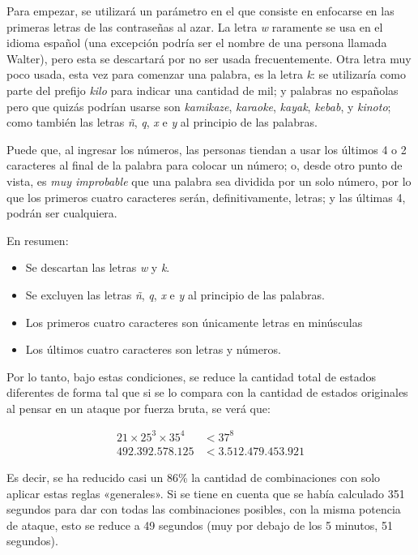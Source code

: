 \documentclass[12pt,a4paper,twoside]{book}
\begin{document}
Para empezar, se utilizará un parámetro en el que consiste en enfocarse en las primeras letras de las contraseñas al azar. La letra \textit{w} raramente se usa en el idioma español (una excepción podría ser el nombre de una persona llamada Walter), pero esta se descartará por no ser usada frecuentemente. Otra letra muy poco usada, esta vez para comenzar una palabra, es la letra \textit{k}: se utilizaría como parte del prefijo \textit{kilo} para indicar una cantidad de mil; y palabras no españolas pero que quizás podrían usarse son \textit{kamikaze}, \textit{karaoke}, \textit{kayak}, \textit{kebab}, y \textit{kinoto}; como también las letras \textit{ñ}, \textit{q}, \textit{x} e \textit{y} al principio de las palabras.

Puede que, al ingresar los números, las personas tiendan a usar los últimos 4 o 2 caracteres al final de la palabra para colocar un número; o, desde otro punto de vista, es \textit{muy improbable} que una palabra sea dividida por un solo número, por lo que los primeros cuatro caracteres serán, definitivamente, letras; y las últimas 4, podrán ser cualquiera.

En resumen: 

\begin{itemize}
\item Se descartan las letras \textit{w} y \textit{k}.
\item Se excluyen las letras \textit{ñ}, \textit{q}, \textit{x} e \textit{y} al principio de las palabras.
\item Los primeros cuatro caracteres son únicamente letras en minúsculas
\item Los últimos cuatro caracteres son letras y números.
\end{itemize}

Por lo tanto, bajo estas condiciones, se reduce la cantidad total de estados diferentes de forma tal que si se lo compara con la cantidad de estados originales al pensar en un ataque por fuerza bruta, se verá que:

\begin{align*}
21 \times 25^3 \times 35^4 &< 37^8 \\
492.392.578.125 &< 3.512.479.453.921
\end{align*}

Es decir, se ha reducido casi un 86\% la cantidad de combinaciones con solo aplicar estas reglas «generales». Si se tiene en cuenta que se había calculado 351 segundos para dar con todas las combinaciones posibles, con la misma potencia de ataque, esto se reduce a 49 segundos (muy por debajo de los 5 minutos, 51 segundos).
\end{document}
